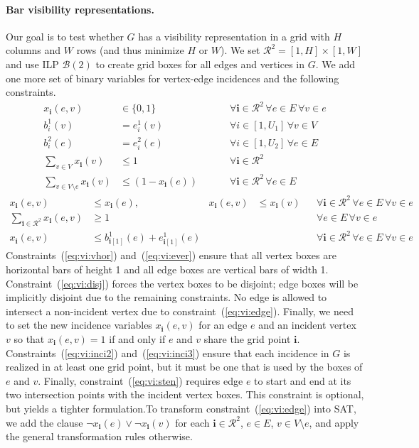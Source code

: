 \documentclass[runningheads]{llncs}
\newcommand{\bvec}[1]{\mathbf{#1}}
\newcounter{constr}
\begin{document}
\paragraph{Bar visibility representations.}
Our goal is to test whether $G$ has a visibility representation in a grid with $H$ columns and $W$ rows (and thus minimize $H$ or $W$). We set $\mathcal R^2 = [1,H]\times[1,W]$ and use ILP $\mathcal B(2)$ to create grid boxes for all edges and vertices in $G$. We add one more set of binary variables for vertex-edge incidences and the following constraints.
\begin{align}
	\label{eq:vi:inci} x_\bvec{i}(e,v) &\in \{0,1\} &&&& \forall \bvec{i} \in \mathcal R^2\, \forall e \in E\, \forall v \in e\\
  \label{eq:vi:vhor} b_i^1(v) &= e_i^1(v) &&&& \forall i \in [1,U_1]\, \forall v \in V\\
  \label{eq:vi:ever} b_i^2(e) &= e_i^2(e) &&&& \forall i \in [1,U_2]\, \forall e \in E\\
  \label{eq:vi:disj} \sum_{v \in V} x_\bvec{i}(v) &\le 1 &&&& \forall \bvec{i} \in \mathcal R^2\\
\label{eq:vi:edge} \sum_{v \in V\setminus e} x_\bvec{i}(v) &\le (1-x_\bvec{i}(e)) &&&& \forall \bvec{i} \in \mathcal R^2\, \forall e \in E
\end{align}
\begin{align}
  \label{eq:vi:inci2} x_\bvec{i}(e,v) &\le x_\bvec{i}(e), & x_\bvec{i}(e,v) &\le x_\bvec{i}(v) && \forall \bvec{i} \in \mathcal R^2\, \forall e \in E\, \forall v \in e\\
  \label{eq:vi:inci3} \sum_{\bvec{i} \in \mathcal R^2} x_\bvec{i}(e,v) &\ge 1 &&&& \forall e \in E\, \forall v \in e\\
  \label{eq:vi:sten} x_\bvec{i}(e,v) &\le b_{\bvec{i}[1]}^1(e) + e_{\bvec{i}[1]}^1(e) &&&& \forall \bvec{i} \in \mathcal R^2\, \forall e \in E\, \forall v \in e
\end{align}
Constraints~(\ref{eq:vi:vhor}) and~(\ref{eq:vi:ever}) ensure that 
all vertex boxes are horizontal bars of height 1 
and all edge boxes are vertical bars of width 1. 
Constraint~(\ref{eq:vi:disj}) forces the vertex boxes to be disjoint; 
edge boxes will be implicitly disjoint due to the remaining constraints. 
No edge is allowed to intersect a non-incident vertex 
due to constraint~(\ref{eq:vi:edge}). 
Finally, we need to set the new incidence variables $x_\bvec{i}(e,v)$ 
for an edge $e$ and an incident vertex $v$ so that $x_\bvec{i}(e,v) = 1$ 
if and only if $e$ and $v$ share the grid point $\bvec{i}$. 
Constraints~(\ref{eq:vi:inci2}) and~(\ref{eq:vi:inci3}) ensure that 
each incidence in $G$ is realized in at least one grid point, 
but it must be one that is used by the boxes of $e$ and $v$. 
Finally, constraint~(\ref{eq:vi:sten}) requires edge $e$ 
to start and end at its two intersection points 
with the incident vertex boxes. 
This constraint is optional, 
but yields a tighter formulation.To transform constraint~(\ref{eq:vi:edge}) into SAT,
we add the clause $\neg x_\bvec{i}(e) \vee \neg x_\bvec{i}(v)$
for each $\bvec{i} \in \mathcal R^2$, $e \in E$, $v \in V \setminus e$, and 
apply the general transformation rules otherwise.
\end{document}
